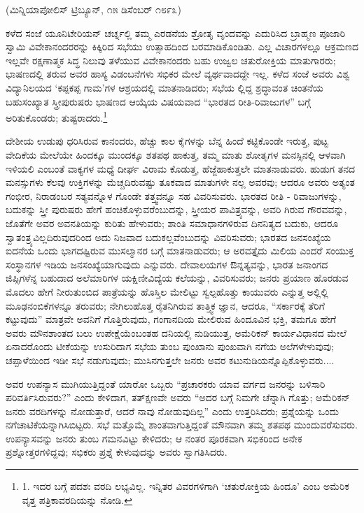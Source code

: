 \begin{center}
(ಮಿನ್ನಿಯಾಪೋಲಿಸ್ ಟ್ರಿಬ್ಯೂನ್, ೧೫ ಡಿಸೆಂಬರ್ ೧೮೯೩)
\end{center}

ಕಳೆದ ಸಂಜೆ ಯೂನಿಟೇರಿಯನ್ ಚರ್ಚ್ನಲ್ಲಿ ತಮ್ಮ ಎರಡನೆಯ ಶ್ರೋತೃ ವೃಂದವನ್ನು ಎದುರಿಸಿದ ಬ್ರಾಹ್ಮಣ ಪೂಜಾರಿ ಸ್ವಾಮಿ ವಿವೇಕಾನಂದರರನ್ನು ಕಿಕ್ಕಿರಿದ ಸಭೆಯು ಉತ್ಸಾಹದಿಂದ ಬರಮಾಡಿಕೊಂಡಿತು. ಎಲ್ಲ ವಿಚಾರಗಳಲ್ಲೂ ಆಕ್ರಮಣದ ಇಲ್ಲವೇ ರಕ್ಷಣಾತ್ಮಕ ಸಿದ್ಧ ನಿಲುವು ತಳೆಯುವ ವಿವೇಕಾನಂದರು ಬಹು ಉಜ್ವಲ ಚತುರೋಕ್ತಿಯ ಮಾತುಗಾರರು; ಭಾಷಣದಲ್ಲಿ ತರುವ ಅವರ ಹಾಸ್ಯ ವಿಡಂಬನೆಗಳು ಸಭಿಕರ ಮೇಲೆ ವ್ಯರ್ಥವಾದದ್ದೇ ಇಲ್ಲ. ಕಳೆದ ಸಂಜೆ ಅವರು ವಿಶ್ವ ವಿದ್ಯಾನಿಲಯದ ‘ಕಪ್ಪಕಪ್ಪ ಗಾಮ’ಗಳ ಆಶ್ರಯದಲ್ಲಿ ಮಾತನಾಡಿದರು; ಸಭೆಯ ಲ್ಲಿದ್ದ ಶ್ರದ್ಧಾವಂತ ಚಿಂತನೆಯ ಬಹುಸಂಖ್ಯಾತ ಸ್ತ್ರೀಪುರುಷರು ಭಾಷಣದ ಆಯ್ಕೆಯ ವಿಷಯವಾದ “ಭಾರತದ ರೀತಿ-ರಿವಾಜುಗಳ” ಬಗ್ಗೆ ಅರಿತುಕೊಂಡರು; ತುಷ್ಟರಾದರು.\footnote{1. ಇದರ ಬಗ್ಗೆ ಪದಶಃ ವರದಿ ಲಭ್ಯವಿಲ್ಲ. ಇನ್ನಿತರ ವಿವರಗಳಿಗಾಗಿ ‘ಚತುರೋಕ್ತಿಯ ಹಿಂದೂ’ ಎಂಬ ಅಮೆರಿಕ ವೃತ್ತ ಪತ್ರಿಕಾವರದಿಯನ್ನು ನೋಡಿ.}

ದೇಶೀಯ ಉಡುಪು ಧರಿಸಿರುವ ಕಾನಂದರು, ಹೆಚ್ಚು ಕಾಲ ಕೈಗಳನ್ನು ಬೆನ್ನ ಹಿಂದೆ ಕಟ್ಟಿಕೊಂಡೇ ಇರುತ್ತ, ಪುಟ್ಟ ವೇದಿಕೆಯ ಮೇಲೆಯೇ ಹಿಂದಕ್ಕೂ ಮುಂದಕ್ಕೂ ಶತಪಥ ಹಾಕುತ್ತ, ತಮ್ಮ ಮಾತು ಶೋತೃಗಳ ಮನಸ್ಸಿನಲ್ಲಿ ಆಳವಾಗಿ ಇಳಿಯಲಿ ಎಂಬಂತೆ ವಾಕ್ಯಗಳ ಮಧ್ಯೆ ದೀರ್ಘ ವಿರಾಮ ಕೊಡುತ್ತ, ಹೆಜ್ಜೆಹಾಕುತ್ತಲೇ ಮಾತನಾಡುವರು. ಹುಡುಗ ತನದ ಮನಸ್ಸುಗಳು ಕೆಲವು ಉಕ್ತಿಗಳನ್ನು ಮೆಚ್ಚದಿರುವಷ್ಟು ತೂಕವಾದ ಮಾತುಗಳೇ ನಲ್ಲ ಅವರವು; ಆದರೂ ಅವರು ಅತ್ಯಂತ ಗಂಭೀರ, ನಿರಾಡಂಬರ ಸತ್ಯವನ್ನೊಳ ಗೊಂಡೇ ತತ್ತ್ವವನ್ನೂ ಸಹ ವಿವರಿಸುವರು. ಭಾರತದ ರೀತಿ - ರಿವಾಜುಗಳನ್ನು, ಬದುಕನ್ನು ಸ್ತ್ರೀ ಪುರುಷರು ಹೇಗೆ ಹಂಚಿಕೊಳ್ಳುವರೆಂಬುದನ್ನು, ಸ್ತ್ರೀಯರ ಪಾವಿತ್ರ್ಯವನ್ನು, ಅವರಿ ಗಿರುವ ಗೌರವವನ್ನು, ಜೊತೆಗೇ ಅವರ ಅವನತಿಯನ್ನು ಕುರಿತು ಹೇಳುವರು; ಶಾಂತಿ ಸಮಾಧಾನಗಳಿರುವ ದಿನನಿತ್ಯದ ಬದುಕು, ಆದರೂ ಸ್ವಾತಂತ್ರ್ಯವಿಲ್ಲದಿರುವುದರಿಂದ ಅದು ನಿಜವಾದ ಬದುಕಲ್ಲವೆಂಬುದನ್ನು ವಿವರಿಸುವರು; ಭಾರತದ ಜನಸಂಖ್ಯೆಯ ಐದನೆಯ ಒಂದು ಭಾಗದಷ್ಟಿರುವ ಮುಸಲ್ಮಾನರ ಬಗ್ಗೆ ಮಾತನಾಡುವರು; ಆ ಅರವತ್ತೈದು ಮಿಲಿಯ ಎಂದರೆ ಸಂಯುಕ್ತ ಸಂಸ್ಥಾನಗಳ ಇಡಿಯ ಜನಸಂಖ್ಯೆಯಾಗುವುದು ಎನ್ನುವರು. ದೇವಾಲಯಗಳ ಔನ್ನತ್ಯವನ್ನು, ಭಾರತ ಜನಾಂಗದ ಜಿಪ್ಸಿಗಳೆನ್ನ ಬಹುದಾದ ಅಲೆಮಾರಿಗಳ ಯಕ್ಷಿಣೀವಿದ್ಯೆಯ ಕಲೆಯನ್ನು, ವಿವರಿಸುವರು; ಜನರು ಪ್ರಯಾಣ ಹೊರಡುವ ಮೊದಲು ಹೇಗೆ ನೀರುತುಂಬಿದ ಪಾತ್ರೆಯನ್ನು ಹೊಸ್ತಿಲ ಮೇಲಿಟ್ಟು ಸ್ವಲ್ಪಹೊತ್ತು ಕಾಯುವರು ಎನ್ನುತ್ತ ಅಲ್ಲಿಲ್ಲಿ ಮೂಢನಂಬಿಕೆಗಳನ್ನೂ ತರುವರು; ನೇಗಿಲುಹೊತ್ತ ರೈತನಿಗಿರುವ ತಾತ್ತ್ವಿಕ ಜ್ಞಾನ, ಆದರೂ, “ಸರ್ಕಾರಕ್ಕೆ ತೆರಿಗೆ ಕಟ್ಟುವುದು” ಮಾತ್ರವೇ ಅವನಿಗೆ ಗೊತ್ತಿರುವುದು, ಗಂಗಾನದಿಯ ಮೇಲಿರುವ ಹಿಂದೂವಿನ ಭಕ್ತಿ, ತಮಗೂ ಹೇಗೆ ಅವರು ಮೌನಶಾಂತದ ಬಲು ಉಪೇಕ್ಷೆಯೆಂಬಂತಹ ದನಿಯಲ್ಲಿ ನುಡಿಯುತ್ತ, ಅಮೆರಿಕನ್ ಕಾರ್ಯವಿಧಾನದ ಮೇಲೆ ಏನಾದರೊಂದು ಟೀಕೆಯನ್ನು ಉಸುರಿದಾಗ ಸಭೆಯ ತುಂಬ ಪುಂಖಾನು ಪುಂಖವಾಗಿ ನಗೆಯ ಅಲೆಗಳೇಳುವುವು; ಚಪ್ಪಾಳೆಯಿಂದ ಇಡೀ ಸಭೆ ನಡುಗುವುದು; ಮುಸಿನಗುತ್ತಲೇ ಜನರು ಅವರ ಕಟುನುಡಿಯನ್ನೊಪ್ಪಿಕೊಳ್ಳುವರು....

ಅವರ ಉಪನ್ಯಾಸ ಮುಗಿಯುತ್ತಿದ್ದಂತೆ ಯಾರೋ ಒಬ್ಬರು “ಪ್ರಚಾರಕರು ಯಾವ ವರ್ಗದ ಜನರನ್ನು ಬಳಿಸಾರಿ ಪರಿವರ್ತಿಸಿರುವರು?” ಎಂದು ಕೇಳಿದಾಗ, ತತ್ಕ್ಷಣವೇ ಅವರು “ಅದರ ಬಗ್ಗೆ ನಿಮಗೇ ಚೆನ್ನಾಗಿ ಗೊತ್ತು; ಅಮೆರಿಕನ್ ಜನರು ವರದಿಗಳನ್ನು ನೋಡುತ್ತಾರೆ, ಆದರೆ ನಾವು ನೋಡುವುದಿಲ್ಲ” ಎಂದು ಉತ್ತರಿಸಿದರು; ಪ್ರಶ್ನೆಯನ್ನು ಒಂದು ನಗೆಚಾಟಿಕೆಯನ್ನಾಗಿಸಿಬಿಟ್ಟರು. ಸಭೆ ಮತ್ತೊಮ್ಮೆ ಶಾಂತವಾಗುತ್ತಿದ್ದಂತೆ ಮೌನವಾಗಿ ತಮ್ಮ ಶತಪಥ ಮುಂದುವರೆಸುವರು. ಉಪನ್ಯಾಸವನ್ನು ಜನರು ತುಂಬ ಗಮನವಿಟ್ಟು ಕೇಳಿದರು; ಆ ನಂತರ ಪೂರಕವಾಗಿ ಸಭಿಕರಿಂದ ಅನೇಕ ಪ್ರಶ್ನೋತ್ತರಗಳಿದ್ದವು; ಸಭಿಕರು ಪ್ರಶ್ನೆ ಕೇಳುವುದನ್ನು ಅವರು ಸ್ವಾಗತಿಸಿದರು.

